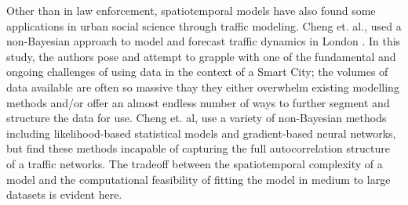 Other than in law enforcement, spatiotemporal models have also found some applications in urban social science through traffic modeling. Cheng et. al., used a non-Bayesian approach to model and forecast traffic dynamics in London \cite{cheng_2012}. In this study, the authors pose and attempt to grapple with one of the fundamental and ongoing challenges of using data in the context of a Smart City; the volumes of data available are often so massive thay they either overwhelm existing modelling methods and/or offer an almost endless number of ways to further segment and structure the data for use. Cheng et. al, use a variety of non-Bayesian methods including likelihood-based statistical models and gradient-based neural networks, but find these methods incapable of capturing the full autocorrelation structure of a traffic networks. The tradeoff between the spatiotemporal complexity of a model and the computational feasibility of fitting the model in medium to large datasets is evident here. \par
